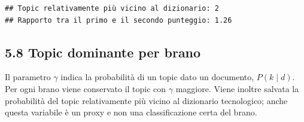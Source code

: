 \documentclass[
]{article}
\begin{document}
\begin{verbatim}
## Topic relativamente più vicino al dizionario: 2 
## Rapporto tra il primo e il secondo punteggio: 1.26
\end{verbatim}

\subsection{5.8 Topic dominante per
brano}\label{topic-dominante-per-brano}

Il parametro \(\gamma\) indica la probabilità di un topic dato un
documento, \(P(k\mid d)\). Per ogni brano viene conservato il topic con
\(\gamma\) maggiore. Viene inoltre salvata la probabilità del topic
relativamente più vicino al dizionario tecnologico; anche questa
variabile è un proxy e non una classificazione certa del brano.
\end{document}
